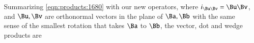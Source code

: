 \index{\(\Ba \cross \Bb\)}
Summarizing \cref{eqn:products:1680} with our new operators, where \( i_{\Bu \Bv} = \Bu \Bv \), and \( \Bu, \Bv \) are orthonormal vectors in the plane of \( \Ba, \Bb \) with the same sense of the smallest rotation that takes \( \Ba \) to \( \Bb \), the vector, dot and wedge products are


